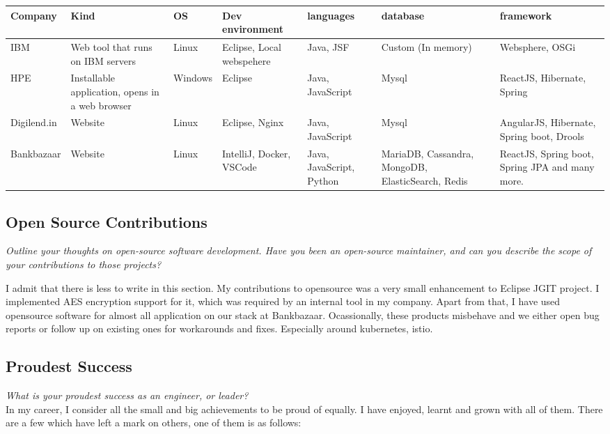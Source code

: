 \documentclass{article}
\begin{document}
\begin{center}
\begin{tabularx}{\textwidth}{ |X|X|X|X|X|X|X| } 
 \hline
 Company & Kind & OS & Dev environment & languages & database & framework \\ 
 \hline
 \hline
 IBM & Web tool that runs on IBM servers & Linux & Eclipse, Local webspehere & Java, JSF & Custom (In memory) & Websphere, OSGi \\ 
 \hline
 HPE & Installable application, opens in a web browser & Windows & Eclipse & Java, JavaScript & Mysql & ReactJS, Hibernate, Spring \\
 \hline
 Digilend.in & Website & Linux & Eclipse, Nginx & Java, JavaScript & Mysql & AngularJS, Hibernate, Spring boot, Drools \\
 \hline
 Bankbazaar & Website & Linux & IntelliJ, Docker, VSCode & Java, JavaScript, Python & MariaDB, Cassandra, MongoDB, ElasticSearch, Redis & ReactJS, Spring boot, Spring JPA and many more. \\
 \hline
\end{tabularx}
\end{center}

\subsection{Open Source Contributions}
\small \textit{Outline your thoughts on open-source software development. Have you been an open-source maintainer, and can you describe the scope of your contributions to those projects?} 
\normalsize 

I admit that there is less to write in this section. My contributions to opensource was a very small enhancement to Eclipse JGIT project. I 
implemented AES encryption support for it, which was required by an internal tool in my company. Apart from that, I have used opensource software 
for almost all application on our stack at Bankbazaar. Ocassionally, these products misbehave and we either open bug reports or 
follow up on existing ones for workarounds and fixes. Especially around kubernetes, istio. 

\subsection{Proudest Success}
\small \textit{What is your proudest success as an engineer, or leader?}
\normalsize
\\[1em]
In my career, I consider all the small and big achievements to be proud of equally. I have enjoyed, learnt and grown with all of them. 
There are a few which have left a mark on others, one of them is as follows:
\end{document}

